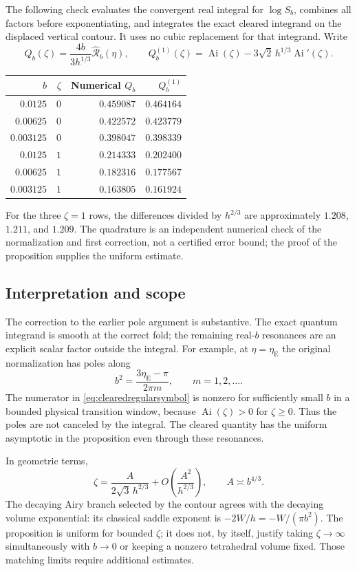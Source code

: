 The following check evaluates the convergent real integral for
$\log S_b$, combines all factors before exponentiating, and
integrates the exact cleared integrand on the displaced
vertical contour. It uses no cubic replacement for that
integrand. Write
\[
 Q_b(\zeta)=\frac{4b}{3h^{1/3}}\widehat{\mathcal R}_b(\eta),
 \qquad
 Q_b^{(1)}(\zeta)=\operatorname{Ai}(\zeta)
       -3\sqrt2\,h^{1/3}\operatorname{Ai}'(\zeta).
\]
\begin{center}
\begin{tabular}{rrrr}
\toprule
$b$&$\zeta$&Numerical $Q_b$&$Q_b^{(1)}$\\
\midrule
$0.0125$&$0$&$0.459087$&$0.464164$\\
$0.00625$&$0$&$0.422572$&$0.423779$\\
$0.003125$&$0$&$0.398047$&$0.398339$\\
$0.0125$&$1$&$0.214333$&$0.202400$\\
$0.00625$&$1$&$0.182316$&$0.177567$\\
$0.003125$&$1$&$0.163805$&$0.161924$\\
\bottomrule
\end{tabular}
\end{center}
For the three $\zeta=1$ rows, the differences divided by
$h^{2/3}$ are approximately $1.208$, $1.211$, and $1.209$.
The quadrature is an independent numerical check of the
normalization and first correction, not a certified error
bound; the proof of the proposition supplies the uniform estimate.

\subsection{Interpretation and scope}

The correction to the earlier pole argument is substantive.
The exact quantum integrand is smooth at the correct fold;
the remaining real-$b$ resonances are an explicit scalar
factor outside the integral. For example, at $\eta=\eta_{\mathrm E}$
the original normalization has poles along
\[
 b^2=\frac{3\eta_{\mathrm E}-\pi}{2\pi m},
       \qquad m=1,2,\ldots.
\]
The numerator in \eqref{eq:clearedregularsymbol} is nonzero
for sufficiently small $b$ in a bounded physical transition
window, because $\operatorname{Ai}(\zeta)>0$ for
$\zeta\ge0$. Thus the poles are not canceled by the integral.
The cleared quantity has the uniform asymptotic in the
proposition even through these resonances.

In geometric terms,
\[
 \zeta=\frac{A}{2\sqrt3\,h^{2/3}}
          +O\!\left(\frac{A^2}{h^{2/3}}\right),
 \qquad A\asymp b^{4/3}.
\]
The decaying Airy branch selected by the contour agrees with
the decaying volume exponential: its classical saddle
exponent is $-2W/h=-W/(\pi b^2)$.
The proposition is uniform for bounded $\zeta$; it does not,
by itself, justify taking $\zeta\to\infty$ simultaneously
with $b\to0$ or keeping a nonzero tetrahedral volume fixed.
Those matching limits require additional estimates.

